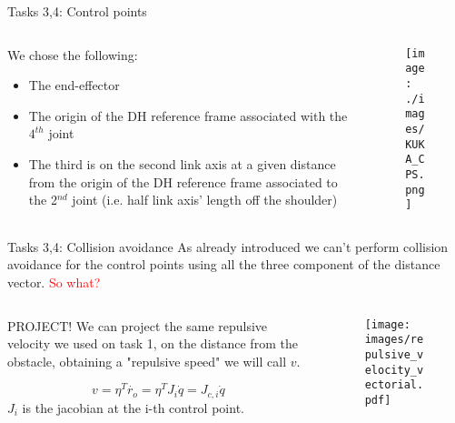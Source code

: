 \documentclass[11pt]{beamer}
\begin{document}
\begin{frame}{Tasks 3,4: Control points}
\begin{columns}
\begin{column}{.5\textwidth}
We chose the following:
\begin{itemize}
\item The end-effector
\item The origin of the DH reference frame associated with the $4^{th}$ joint
\item The third is on the second link axis at a given distance from the origin of the DH reference frame associated to the 2$^{nd}$ joint (i.e. half link axis' length off the shoulder)
\end{itemize}
\end{column}
\begin{column}{.5\textwidth}
\begin{figure}[H]
\texttt{[image: ./images/KUKA\_CPS.png]}
\end{figure}
\end{column}
\end{columns}
\end{frame}

\begin{frame}{Tasks 3,4: Collision avoidance}
As already introduced we can't perform collision avoidance for the control points using all the three component of the distance vector. \textcolor{red}{So what?}
\begin{columns}
\begin{column}{.5\textwidth}
\begin{block}{PROJECT!}
We can project the same repulsive velocity we used on task 1, on the distance from the obstacle, obtaining a "repulsive speed" we will call $v$.
\end{block}
\begin{equation*}
v = \eta^T\dot{r_{o}} = \eta^T J_i\dot{q} = J_{c,i}\dot{q}
\end{equation*}
$J_i$ is the jacobian at the i-th control point.
\end{column}
\begin{column}{.5\textwidth}
			\begin{figure}[H]
				\texttt{[image: images/repulsive\_velocity\_vectorial.pdf]}
			\end{figure}
		\end{column}
\end{columns}
\end{frame}
\end{document}
